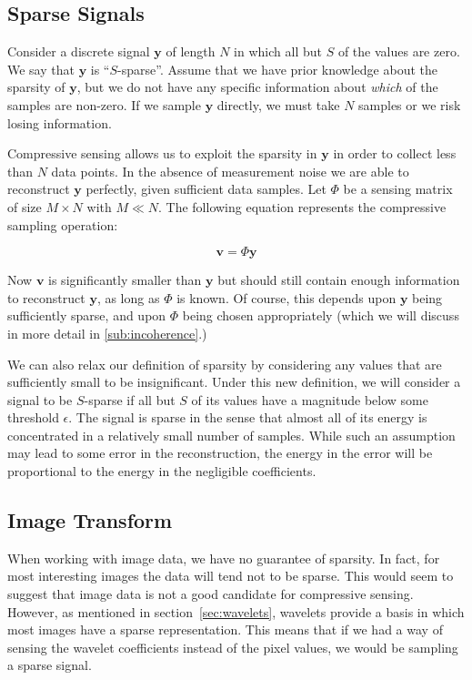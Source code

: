 \documentclass{IEEEtran}
\newcommand{\bfv}{\mathbf{v}}
\newcommand{\bfy}{\mathbf{y}}
\begin{document}
\subsection{Sparse Signals}
Consider a discrete signal $\bfy$ of length $N$ in which all but $S$ of the values are zero. We say that $\bfy$ is ``$S$-sparse''.  Assume that we have prior knowledge about the sparsity of $\bfy$, but we do not have any specific information about \emph{which} of the samples are non-zero. If we sample $\bfy$ directly, we must take $N$ samples or we risk losing information.

Compressive sensing allows us to exploit the sparsity in $\bfy$ in order to collect less than $N$ data points.  In the absence of measurement noise we are able to reconstruct $\bfy$ perfectly, given sufficient data samples. Let $\Phi$ be a sensing matrix of size $M \times N$ with $M \ll N$. The following equation represents the compressive sampling operation:

\begin{equation}
  \label{eq:sense}
  \bfv = \Phi \bfy
\end{equation}

Now $\bfv$ is significantly smaller than $\bfy$ but should still contain enough information to reconstruct $\bfy$, as long as $\Phi$ is known. Of course, this depends upon $\bfy$ being sufficiently sparse, and upon $\Phi$ being chosen appropriately (which we will discuss in more detail in \ref{sub:incoherence}.)

We can also relax our definition of sparsity by considering any values that are sufficiently small to be insignificant.  Under this new definition, we will consider a signal to be $S$-sparse if all but $S$ of its values have a magnitude below some threshold $\epsilon$.  The signal is sparse in the sense that almost all of its energy is concentrated in a relatively small number of samples.  While such an assumption may lead to some error in the reconstruction, the energy in the error will be proportional to the energy in the negligible coefficients.

\subsection{Image Transform}

When working with image data, we have no guarantee of sparsity. In fact, for most interesting images the data will tend not to be sparse. This would seem to suggest that image data is not a good candidate for compressive sensing. However, as mentioned in section~\ref{sec:wavelets}, wavelets provide a basis in which most images have a sparse representation.  This means that if we had a way of sensing the wavelet coefficients instead of the pixel values, we would be sampling a sparse signal.
\end{document}
